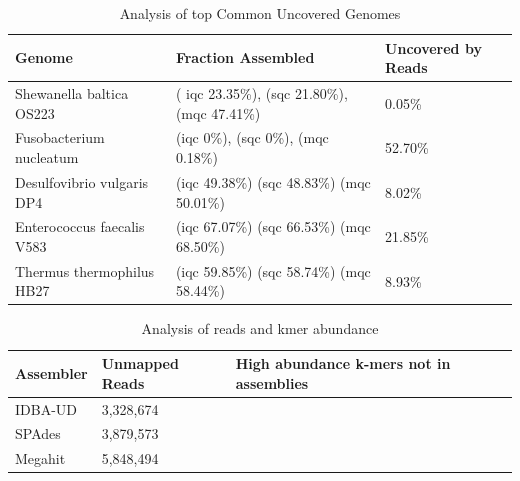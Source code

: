 \documentclass[10pt,a4paper,twocolumn]{article}
\begin{document}
\begin{table}[!h]
\centering
\caption{Analysis of top Common Uncovered Genomes}
\begin{tabular}{|p{3cm}|p{2.75cm}|p{1.5cm}|}\hline
\textbf{Genome} & \textbf{Fraction Assembled} & \textbf {Uncovered by Reads} \\ \hline 
Shewanella baltica OS223 &( iqc 23.35\%), (sqc 21.80\%), (mqc 47.41\%) &0.05\% \\ \hline
Fusobacterium nucleatum  &(iqc 0\%), (sqc 0\%), (mqc 0.18\%)&52.70\% \\ \hline
Desulfovibrio vulgaris DP4  &(iqc 49.38\%) (sqc 48.83\%) (mqc 50.01\%) &8.02\% \\ \hline
Enterococcus faecalis V583  &(iqc 67.07\%) (sqc 66.53\%) (mqc 68.50\%)&21.85\% \\ \hline
Thermus thermophilus HB27  &(iqc 59.85\%) (sqc 58.74\%) (mqc 58.44\%)&8.93\% \\ \hline
\end{tabular}
\label{table:genomes_uncovered-analysis}
\end{table}





\begin{table}[!h]
\centering
\caption{Analysis of reads and kmer abundance}
\begin{tabular}{|p{1.5cm}|p{1.5cm}|p{2.5cm}|}\hline
\textbf{Assembler} & \textbf{Unmapped Reads} & \textbf {High abundance k-mers not in assemblies} \\ \hline 
IDBA-UD &3,328,674 &   \\ \hline
SPAdes &3,879,573 &   \\ \hline
Megahit &5,848,494 &   \\ \hline
\end{tabular}
\label{table:reads-kmers}
\end{table}



\end{document}
